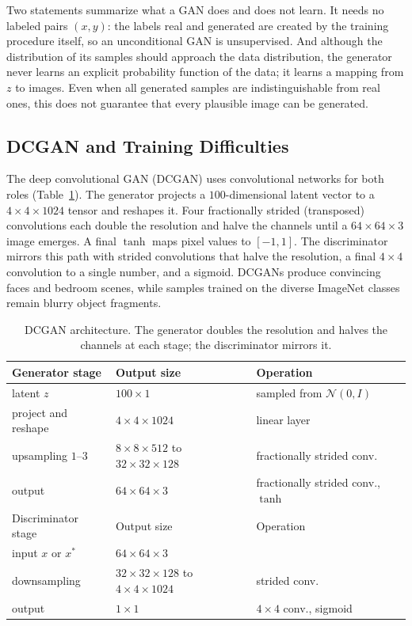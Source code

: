 Two statements summarize what a GAN does and does not learn. It needs no
labeled pairs $(x,y)$: the labels real and generated are created by the
training procedure itself, so an unconditional GAN is unsupervised.
And although the distribution of its samples should approach the data
distribution, the generator never learns an explicit probability function of
the data; it learns a mapping from $z$ to images. Even when all generated
samples are indistinguishable from real ones, this does not guarantee that
every plausible image can be generated.

\subsection{DCGAN and Training Difficulties}

The deep convolutional GAN (DCGAN) uses convolutional networks for both roles
(Table~\ref{tab:dcgan}). The generator projects a $100$-dimensional latent
vector to a $4\times4\times1024$ tensor and reshapes it. Four fractionally
strided (transposed) convolutions each double the resolution and halve the
channels until a $64\times64\times3$ image emerges. A final $\tanh$ maps
pixel values to $[-1,1]$. The discriminator mirrors this path with strided
convolutions that halve the resolution, a final $4\times4$ convolution to a
single number, and a sigmoid. DCGANs produce convincing faces and bedroom
scenes, while samples trained on the diverse ImageNet classes remain
blurry object fragments.

\begin{table}[ht]
  \centering
  \begin{tabular}{@{}p{4.3cm}p{4.3cm}p{5.4cm}@{}}
    \toprule
    Generator stage & Output size & Operation \\
    \midrule
    latent $z$ & $100\times1$ & sampled from $\mathcal N(0,I)$ \\
    project and reshape & $4\times4\times1024$ & linear layer \\
    upsampling $1$--$3$ & $8\times8\times512$ to $32\times32\times128$ &
      fractionally strided conv. \\
    output & $64\times64\times3$ & fractionally strided conv., $\tanh$ \\
    \midrule
    Discriminator stage & Output size & Operation \\
    \midrule
    input $x$ or $x^*$ & $64\times64\times3$ & \\
    downsampling & $32\times32\times128$ to $4\times4\times1024$ & strided
      conv. \\
    output & $1\times1$ & $4\times4$ conv., sigmoid \\
    \bottomrule
  \end{tabular}
  \caption{DCGAN architecture. The generator doubles the resolution and halves
  the channels at each stage; the discriminator mirrors it.}
  \label{tab:dcgan}
\end{table}

